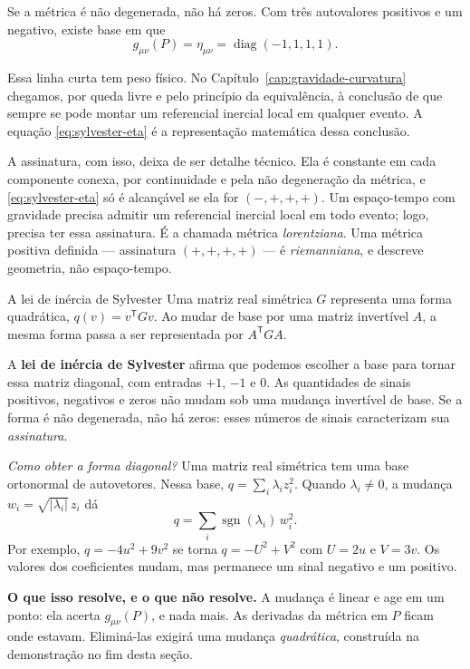 \documentclass[12pt,a4paper,oneside]{book}
\theoremstyle{rgplain}
\theoremstyle{rgremark}
\begin{document}
Se a métrica é não degenerada, não há zeros. Com três autovalores positivos e
um negativo, existe base em que
\begin{equation}
  g_{\mu\nu}(P)=\eta_{\mu\nu}=\operatorname{diag}(-1,1,1,1).
  \label{eq:sylvester-eta}
\end{equation}

Essa linha curta tem peso físico. No Capítulo~\ref{cap:gravidade-curvatura}
chegamos, por queda livre e pelo princípio da equivalência, à conclusão de que
sempre se pode montar um referencial inercial local em qualquer evento. A
equação \eqref{eq:sylvester-eta} é a representação matemática dessa conclusão.

A assinatura, com isso, deixa de ser detalhe técnico. Ela é constante em cada
componente conexa, por continuidade e pela não degeneração da métrica, e
\eqref{eq:sylvester-eta} só é alcançável se ela for $(-,+,+,+)$. Um
espaço-tempo com gravidade precisa admitir um referencial inercial local em
todo evento; logo, precisa ter essa assinatura. É a chamada métrica
\emph{lorentziana}. Uma métrica positiva definida --- assinatura
$(+,+,+,+)$ --- é \emph{riemanniana}, e descreve geometria, não
espaço-tempo.

\begin{interludio}[breakable=false]{A lei de inércia de Sylvester}
Uma matriz real simétrica $G$ representa uma forma quadrática,
$q(v)=v^{\mathsf T}Gv$. Ao mudar de base por uma matriz invertível $A$, a
mesma forma passa a ser representada por $A^{\mathsf T}GA$.

A \textbf{lei de inércia de Sylvester} afirma que podemos escolher a base
para tornar essa matriz diagonal, com entradas $+1$, $-1$ e $0$. As
quantidades de sinais positivos, negativos e zeros não mudam sob uma mudança
invertível de base. Se a forma é não degenerada, não há zeros: esses números
de sinais caracterizam sua \emph{assinatura}.

\emph{Como obter a forma diagonal?} Uma matriz real simétrica tem uma base
ortonormal de autovetores. Nessa base, $q=\sum_i\lambda_i z_i^2$. Quando
$\lambda_i\ne0$, a mudança $w_i=\sqrt{|\lambda_i|}\,z_i$ dá
\[
  q=\sum_i\operatorname{sgn}(\lambda_i)\,w_i^2.
\]
Por exemplo, $q=-4u^2+9v^2$ se torna $q=-U^2+V^2$ com $U=2u$ e $V=3v$.
Os valores dos coeficientes mudam, mas permanece um sinal negativo e um
positivo.

\textbf{O que isso resolve, e o que não resolve.} A mudança é linear e age em
um ponto: ela acerta $g_{\mu\nu}(P)$, e nada mais. As derivadas da métrica em
$P$ ficam onde estavam. Eliminá-las exigirá uma mudança \emph{quadrática},
construída na demonstração no fim desta seção.
\end{interludio}
\end{document}

